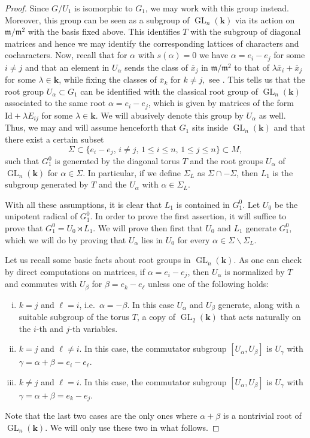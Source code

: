 \documentclass[11pt,letterpaper,reqno]{amsart}
\theoremstyle{remark}
\theoremstyle{definition}
\def\M{\mathfrak{m}}
\newcommand{\KK}[0]{\ensuremath{\mathbf{k}}}
\newcommand{\GL}[0]{\ensuremath{\operatorname{GL}}}
\begin{document}
\begin{proof}
Since $G/U_1$ is isomorphic to $G_1$, we may work with this group instead. Moreover, this group can be seen as a subgroup of $\GL_n(\KK)$ via its action on $\M/\M^2$ with the basis fixed above. This identifies $T$ with the subgroup of diagonal matrices and hence we may identify the corresponding lattices of characters and cocharacters. Now, recall that for $\alpha$ with $s(\alpha)=0$ we have $\alpha=e_i-e_j$ for some $i\neq j$ and that an element in $U_\alpha$ sends the class of $\overline x_j$ in $\M/\M^2$ to that of $\lambda\overline x_i+\overline x_j$ for some $\lambda\in\KK$, while fixing the classes of $\overline x_k$ for $k\neq j,$ see . This tells us that the root group $U_\alpha\subset G_1$ can be identified with the classical root group of $\GL_n(\KK)$ associated to the same root $\alpha=e_i-e_j$, which is given by matrices of the form $\mathrm{Id}+\lambda E_{ij}$ for some $\lambda\in\KK$. We will abusively denote this group by $U_\alpha$ as well. Thus, we may and will assume henceforth that $G_1$ sits inside $\GL_n(\KK)$ and that there exist a certain subset
$$\Sigma\subset\{e_i-e_j,\,i\neq j,\,1\leq i\leq n,\,1\leq j\leq n\}\subset M,$$
such that $G_1^0$ is generated by the diagonal torus $T$ and the root groups $U_\alpha$ of $\GL_n(\KK)$ for $\alpha\in \Sigma$. In particular, if we define $\Sigma_L$ as $\Sigma\cap-\Sigma$, then $L_1$ is the subgroup generated by $T$ and the $U_{\alpha}$ with $\alpha\in \Sigma_L$.

With all these assumptions, it is clear that $L_1$ is contained in $G_1^0$. Let $U_0$ be the unipotent radical of $G_1^0$. In order to prove the first assertion, it will suffice to prove that $G_1^0=U_0\rtimes L_1$. We will prove then first that $U_0$ and $L_1$ generate $G_1^0$, which we will do by proving that $U_\alpha$ lies in $U_0$ for every $\alpha\in \Sigma\smallsetminus \Sigma_L$.

Let us recall some basic facts about root groups in $\GL_n(\KK)$. As one can check by direct computations on matrices, if $\alpha=e_i-e_j$, then $U_\alpha$ is normalized by $T$ and commutes with $U_\beta$ for $\beta=e_k-e_\ell$ unless one of the following holds:
\begin{enumerate}[(i)]
    \item $k=j$ and $\ell=i$, i.e.~$\alpha=-\beta$. In this case $U_\alpha$ and $U_\beta$ generate, along with a suitable subgroup of the torus $T$, a copy of $\GL_2(\KK)$ that acts naturally on the $i$-th and $j$-th variables.
    \item $k=j$ and $\ell\neq i$. In this case, the commutator subgroup $[U_\alpha,U_\beta]$ is $U_\gamma$ with $\gamma=\alpha+\beta=e_i-e_\ell$.
    \item $k\neq j$ and $\ell=i$. In this case, the commutator subgroup $[U_\alpha,U_\beta]$ is $U_\gamma$ with $\gamma=\alpha+\beta=e_k-e_j$.
\end{enumerate}
Note that the last two cases are the only ones where $\alpha+\beta$ is a nontrivial root of $\GL_n(\KK)$. We will only use these two in what follows.


\end{proof}
\end{document}
